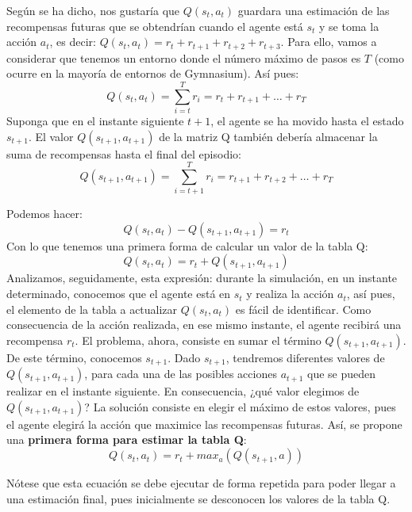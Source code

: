 \documentclass{article}
\begin{document}
Según se ha dicho, nos gustaría que $Q(s_t,a_t)$ guardara una estimación de las recompensas futuras que se obtendrían cuando el agente está $s_t$ y se toma la acción $a_t$, es decir:
$Q(s_t,a_t)=r_t + r_{t+1} + r_{t+2} + r_{t+3}$. Para ello, vamos a considerar que tenemos un entorno donde el número máximo de pasos es $T$ (como ocurre en la mayoría de entornos de Gymnasium). Así pues:
\begin{equation}\label{eq:estandar_sum_of_rewards}
Q(s_t,a_t) = \sum_{i=t}^{T} r_i= r_t +  r_{t+1}+ \ldots + r_T
\end{equation}
Suponga que en el instante siguiente $t+1$, el agente se ha movido hasta el estado $s_{t+1}$. El valor $Q(s_{t+1},a_{t+1})$ de la matriz Q también debería almacenar la suma de recompensas hasta el final del episodio:
\begin{equation}
Q(s_{t+1},a_{t+1}) = \sum_{i=t+1}^{T} r_i = r_{t+1} +r_{t+2} + \ldots + r_T     
\end{equation}

Podemos hacer: 
\begin{equation}
    Q(s_t,a_t) - Q(s_{t+1},a_{t+1}) = r_t
\end{equation}
Con lo que tenemos una primera forma de calcular un valor de la tabla Q:
\begin{equation*}
Q(s_t,a_t) = r_t + Q(s_{t+1},a_{t+1})   
\end{equation*}
Analizamos, seguidamente, esta expresión: durante la simulación, en un instante determinado, conocemos que el agente está en $s_t$ y realiza la acción $a_t$, así pues, el elemento de la tabla a actualizar $Q(s_t , a_t)$ es fácil de identificar. Como consecuencia de la acción realizada, en ese mismo instante, el agente recibirá una recompensa $r_t$. El problema, ahora, consiste en sumar el término $Q(s_{t+1},a_{t+1})$. De este término, conocemos $s_{t+1}$. Dado $s_{t+1}$, tendremos diferentes valores de $Q(s_{t+1}, a_{t+1})$, para cada una de las posibles acciones $a_{t+1}$ que se pueden realizar en el instante siguiente. En consecuencia, ¿qué valor elegimos de $Q(s_{t+1},a_{t+1})$? La solución consiste en elegir el máximo de estos valores, pues el agente elegirá la acción que maximice las recompensas futuras. Así, se propone una \textbf{primera forma para estimar la tabla Q}:
\begin{equation*}
Q(s_t,a_t) = r_t + max_a(Q(s_{t+1},a))
\end{equation*}

Nótese que esta ecuación se debe ejecutar de forma repetida para poder llegar a una estimación final, pues inicialmente se desconocen los valores de la tabla Q. 
\end{document}
